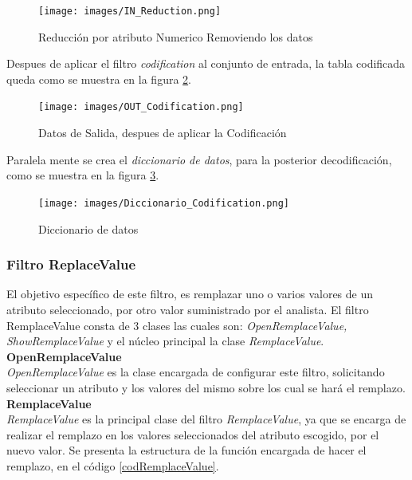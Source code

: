\begin{figure}[h]
\centering
\texttt{[image: images/IN\_Reduction.png]}
\caption{Reducci\'on por atributo Numerico Removiendo los datos}
\label{figCodification}
\end{figure}


Despues de aplicar el filtro \textit{codification} al conjunto de entrada, la tabla codificada queda como se muestra en la figura \ref{OUT_Codification}. \\

\begin{figure}[h]
\centering
\texttt{[image: images/OUT\_Codification.png]}
\caption{Datos de Salida, despues de aplicar la Codificaci\'on}
\label{OUT_Codification}
\end{figure}

Paralela mente se crea el \textit{diccionario de datos}, para la posterior decodificaci\'on, como se muestra en la figura \ref{Diccionario}. \\

\begin{figure}[h]
\centering
\texttt{[image: images/Diccionario\_Codification.png]}
\caption{Diccionario de datos}
\label{Diccionario}
\end{figure}


\subsubsection{Filtro ReplaceValue}
El objetivo espec\'ifico de este filtro, es remplazar uno o varios valores de un atributo seleccionado, por otro valor suministrado por el analista.
El filtro  RemplaceValue consta de 3 clases las cuales son: \textit{OpenRemplaceValue, ShowRemplaceValue} y el n\'ucleo principal la clase \textit{RemplaceValue}. \\

\textbf{OpenRemplaceValue} \\ 
\textit{OpenRemplaceValue} es la clase encargada de configurar este filtro, solicitando seleccionar un atributo y los valores del mismo sobre los cual se har\'a el remplazo.\\

\textbf{RemplaceValue} \\ 
\textit{RemplaceValue} es la principal clase del filtro \textit{RemplaceValue}, ya que se encarga de realizar el remplazo en los valores seleccionados del atributo escogido, por el nuevo valor.
Se presenta la estructura de la funci\'on encargada de hacer  el remplazo, en el c\'odigo \ref{codRemplaceValue}. \\
      
